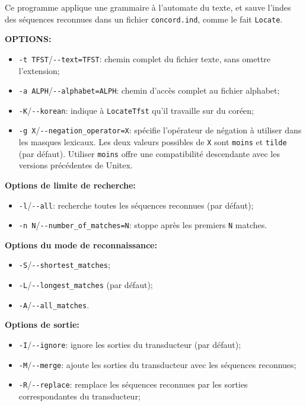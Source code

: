 \bigskip
\noindent {}
Ce programme applique une grammaire à l'automate du texte, et sauve l'indes des séquences reconnues dans un fichier \verb+concord.ind+, comme le fait \verb+Locate+.

\bigskip
\noindent \textbf{OPTIONS:}
\begin{itemize}
  \item \verb+-t TFST+/\verb+--text=TFST+: chemin complet du fichier texte, 
  sans omettre l’extension;

  \item \verb+-a ALPH+/\verb+--alphabet=ALPH+: chemin d’accès complet au fichier
  	  alphabet;
  
  \item \verb+-K+/\verb+--korean+: indique à \verb+LocateTfst+ qu'il travaille sur du coréen;

  \item \verb+-g X+/\verb+--negation_operator=X+: spécifie l'opérateur de négation à utiliser dans
  	  les masques lexicaux. Les deux valeurs possibles de \verb+X+ sont \verb+moins+ et \verb+tilde+
  	  (par défaut).
  Utiliser \verb+moins+  offre une compatibilité descendante avec les versions précédentes de
  Unitex.
  
\end{itemize}

\bigskip
\noindent \textbf{Options de limite de recherche:}
\begin{itemize}
  \item \verb+-l+/\verb+--all+: recherche toutes les séquences reconnues (par défaut);
  \item \verb+-n N+/\verb+--number_of_matches=N+: stoppe après les premiers
  \verb+N+ matches.
\end{itemize}

\bigskip
\noindent \textbf{Options du mode de reconnaissance:}
\begin{itemize}
  \item \verb+-S+/\verb+--shortest_matches+;
  \item \verb+-L+/\verb+--longest_matches+ (par défaut);
  \item \verb+-A+/\verb+--all_matches+.
\end{itemize}

\bigskip
\noindent \textbf{Options de sortie:}
\begin{itemize}
  \item \verb+-I+/\verb+--ignore+: ignore les sorties du transducteur (par défaut);
  \item \verb+-M+/\verb+--merge+: ajoute les sorties du transducteur avec les séquences reconnues;
  \item \verb+-R+/\verb+--replace+: remplace les séquences reconnues par les sorties correspondantes
  	  du transducteur;
\end{itemize}

